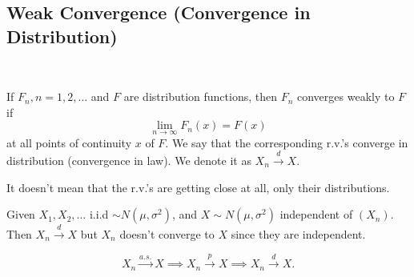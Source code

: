 \documentclass[class=article,crop=false]{standalone}
\begin{document}
\subsection{Weak Convergence (Convergence in Distribution)}
~\begin{defn}
If $ F_n, n=1,2,\ldots$ and $ F$ are distribution functions, then  $ F_n$ converges weakly to $ F$ if
\[
	\lim_{ n \to \infty} F_n(x)=F(x)
\] 
at all points of continuity $ x$ of  $ F$. We say that the corresponding r.v.'s converge in distribution (convergence in law).  We denote it as $ X_n \xrightarrow{ d}X $.
\end{defn}
\begin{note}[]
It doesn't mean that the r.v.'s are getting close at all, only their distributions.
\end{note}

\begin{eg}[]
	Given $ X_1,X_2,\ldots$ i.i.d $ \sim N(\mu, \sigma^2)$, and $ X \sim N(\mu, \sigma^2)$ independent of $ (X_n)$. Then $ X_n \xrightarrow{ d} X $ but $ X_n $ doesn't converge to $ X$ since they are independent.
\end{eg}

\begin{thm}[]
\[ X_n \xrightarrow{ a.s.} X  \implies X_n \xrightarrow{ p} X \implies X_n \xrightarrow{ d} X .\]
\end{thm}
\end{document}
